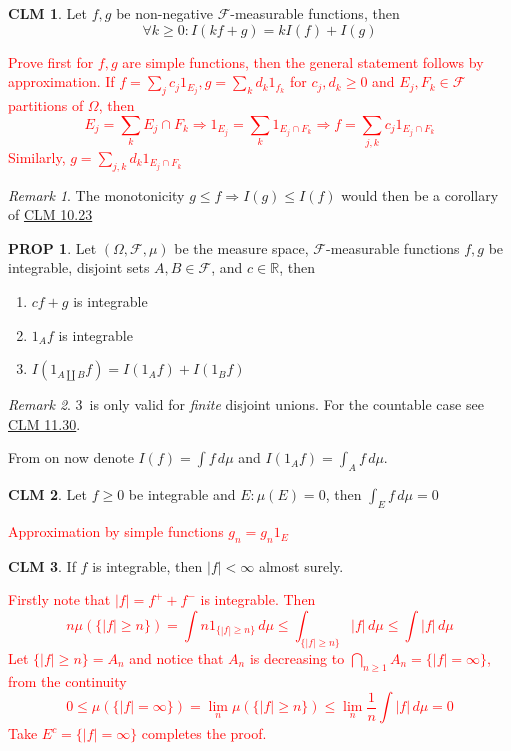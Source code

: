 \documentclass[hidelinks]{article}
\theoremstyle{definition}
\theoremstyle{dotless}
\newtheorem{proposition}{PROP}[section]
\newtheorem{claim}{CLM}[section]
\theoremstyle{remark}
\newtheorem*{remark}{Remark}
\begin{document}
\begin{claim}\label{CLM 10.23}
Let $f,g$ be non-negative $\mathscr{F}$-measurable functions, then
\[\forall k\geq0:I(kf+g)=kI(f)+I(g)\]
\end{claim}
\textcolor{red}{Prove first for $f,g$ are simple functions, then the general statement follows by approximation.\newline
If $f=\sum\limits_jc_j1_{E_j},g=\sum\limits_kd_k1_{f_k}$ for $c_j,d_k\geq0$ and $E_j,F_k\in\mathscr{F}$ partitions of $\Omega$, then
\[E_j=\sum_kE_j\cap F_k\Rightarrow1_{E_j}=\sum_k1_{E_j\cap F_k}\Rightarrow f=\sum_{j,k}c_j1_{E_j\cap F_k}\]
Similarly, $g=\sum\limits_{j,k}d_k1_{E_j\cap F_k}$}

\begin{remark}
The monotonicity $g\leq f\Rightarrow I(g)\leq I(f)$ would then be a corollary of \hyperref[CLM 10.23]{CLM 10.23}
\end{remark}

\begin{proposition}
Let $(\Omega,\mathscr{F},\mu)$ be the measure space, $\mathscr{F}$-measurable functions $f,g$ be integrable, disjoint sets $A,B\in\mathscr{F}$, and $c\in\mathbb{R}$, then
\begin{enumerate}[label=\arabic*\degree]
    \item $cf+g$ is integrable
    \item $1_Af$ is integrable
    \item $I(1_{A\coprod B}f)=I(1_Af)+I(1_Bf)$
\end{enumerate}
\end{proposition}

\begin{remark}
3\degree\ is only valid for \emph{finite} disjoint unions. For the countable case see \hyperref[CLM 11.30]{CLM 11.30}.
\end{remark}

\bigbreak

From on now denote $I(f)=\int f\,d\mu$ and $I(1_Af)=\int_A f\,d\mu$.

\medbreak

\begin{claim}
Let $f\geq0$ be integrable and $E:\mu(E)=0$, then $\int_Ef\,d\mu=0$
\end{claim}
\textcolor{red}{Approximation by simple functions $g_n=g_n1_E$}

\begin{claim}\label{CLM 10.25}
If $f$ is integrable, then $|f|<\infty$ almost surely.
\end{claim}
\textcolor{red}{Firstly note that $|f|=f^++f^-$ is integrable. Then
\[n\mu(\{|f|\geq n\})=\int n1_{\{|f|\geq n\}}\,d\mu\leq\int_{\{|f|\geq n\}}|f|\,d\mu\leq\int|f|\,d\mu\]
Let $\{|f|\geq n\}=A_n$ and notice that $A_n$ is decreasing to $\bigcap\limits_{n\geq1}A_n=\{|f|=\infty\}$, from the continuity
\[0\leq\mu(\{|f|=\infty\})=\lim_n\mu(\{|f|\geq n\})\leq\lim_n\frac{1}{n}\int|f|\,d\mu=0\]
Take $E^c=\{|f|=\infty\}$ completes the proof.}
\end{document}
